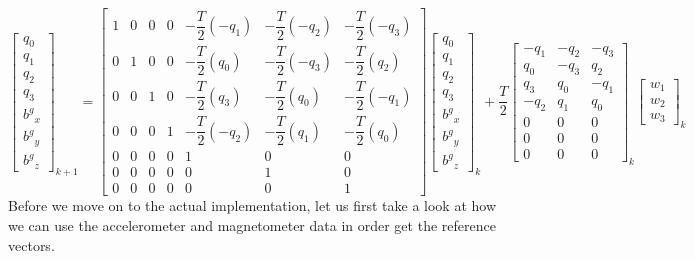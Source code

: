 \documentclass[a4paper,12pt]{book}
\begin{document}
\begin{equation}
    \begin{bmatrix} q_0 \\ q_1 \\ q_2 \\ q_3 \\ {b^g}_x \\ {b^g}_y \\ {b^g}_z \end{bmatrix}_{k+1} = \begin{bmatrix} 1 & 0 & 0 & 0 & -\dfrac{T}{2}(-q_1) & -\dfrac{T}{2}(-q_2) & -\dfrac{T}{2}(-q_3) \\ 0 & 1 & 0 & 0 & -\dfrac{T}{2}(q_0) & -\dfrac{T}{2}(-q_3) & -\dfrac{T}{2}(q_2) \\ 0 & 0 & 1 & 0 & -\dfrac{T}{2}(q_3) & -\dfrac{T}{2}(q_0) & -\dfrac{T}{2}(-q_1) \\ 0 & 0 & 0 & 1 & -\dfrac{T}{2}(-q_2) & -\dfrac{T}{2}(q_1) & -\dfrac{T}{2}(q_0) \\ 0 & 0 & 0 & 0 & 1 & 0 & 0 \\ 0 & 0 & 0 & 0 & 0 & 1 & 0 \\ 0 & 0 & 0 & 0 & 0 & 0 & 1 \end{bmatrix} \begin{bmatrix} q_0 \\ q_1 \\ q_2 \\ q_3 \\ {b^g}_x \\ {b^g}_y \\ {b^g}_z \end{bmatrix}_k + \dfrac{T}{2}\begin{bmatrix} -q_1 & -q_2 & -q_3 \\ q_0 & -q_3 & q_2 \\ q_3 & q_0 & -q_1 \\ -q_2 & q_1 & q_0 \\ 0 & 0 & 0 \\ 0 & 0 & 0 \\ 0 & 0 & 0 \end{bmatrix}_k \begin{bmatrix} w_1 \\ w_2 \\ w_3\end{bmatrix}_k
\end{equation}
Before we move on to the actual implementation, let us first take a look at how we can use the accelerometer and magnetometer data in order get the reference vectors. 
\end{document}
